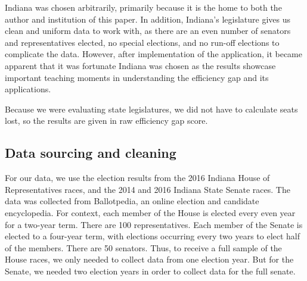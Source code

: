 \documentclass[sigconf]{acmart}
\begin{document}
Indiana was chosen arbitrarily, primarily because it is the home to both the author and institution of this paper. In addition, Indiana's legislature gives us clean and uniform data to work with, as there are an even number of senators and representatives elected, no special elections, and no run-off elections to complicate the data. However, after implementation of the application, it became apparent that it was fortunate Indiana was chosen as the results showcase important teaching moments in understanding the efficiency gap and its applications.

Because we were evaluating state legislatures, we did not have to calculate seats lost, so the results are given in raw efficiency gap score. 

\subsection{Data sourcing and cleaning}

For our data, we use the election results from the 2016 Indiana House of Representatives races\cite{houseresults}, and the 2014 and 2016 Indiana State Senate races\cite{senateresults2014}\cite{senateresults2016}. The data was collected from Ballotpedia, an online election and candidate encyclopedia. For context, each member of the House is elected every even year for a two-year term. There are 100 representatives. Each member of the Senate is elected to a four-year term, with elections occurring every two years to elect half of the members. There are 50 senators. Thus, to receive a full sample of the House races, we only needed to collect data from one election year. But for the Senate, we needed two election years in order to collect data for the full senate.
\end{document}
